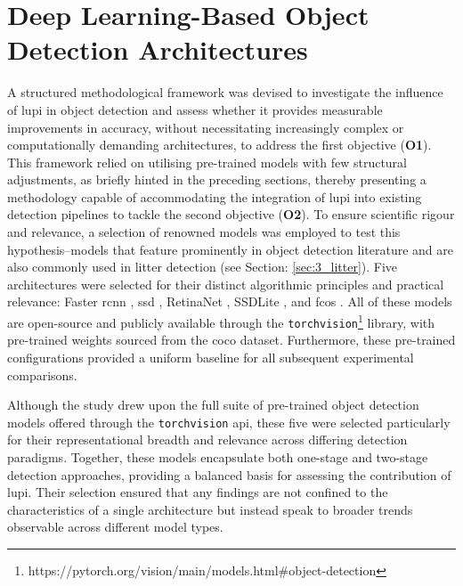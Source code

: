 \section{Deep Learning-Based Object Detection Architectures}
\label{sec:4_distillation_architectures}

A structured methodological framework was devised to investigate the influence of \gls{lupi} in object detection and assess whether it provides measurable improvements in accuracy, without necessitating increasingly complex or computationally demanding architectures, to address the first objective (\textbf{O1}). This framework relied on utilising pre-trained models with few structural adjustments, as briefly hinted in the preceding sections, thereby presenting a methodology capable of accommodating the integration of \gls{lupi} into existing detection pipelines to tackle the second objective (\textbf{O2}).
To ensure scientific rigour and relevance, a selection of renowned models was employed to test this hypothesis--models that feature prominently in object detection literature and are also commonly used in litter detection (see Section: \ref{sec:3_litter}). Five architectures were selected for their distinct algorithmic principles and practical relevance: Faster \gls{rcnn} \cite{rcnn}, \gls{ssd} \cite{ssd}, RetinaNet \cite{retinanet}, SSDLite \cite{ssdlite}, and \gls{fcos} \cite{fcos}. All of these models are open-source and publicly available through the \verb|torchvision|\footnote{https://pytorch.org/vision/main/models.html\#object-detection} library, with pre-trained weights sourced from the \gls{coco} dataset. Furthermore, these pre-trained configurations provided a uniform baseline for all subsequent experimental comparisons.

Although the study drew upon the full suite of pre-trained object detection models offered through the \verb|torchvision| \gls{api}, these five were selected particularly for their representational breadth and relevance across differing detection paradigms. Together, these models encapsulate both one-stage and two-stage detection approaches, providing a balanced basis for assessing the contribution of \gls{lupi}. Their selection ensured that any findings are not confined to the characteristics of a single architecture but instead speak to broader trends observable across different model types.

